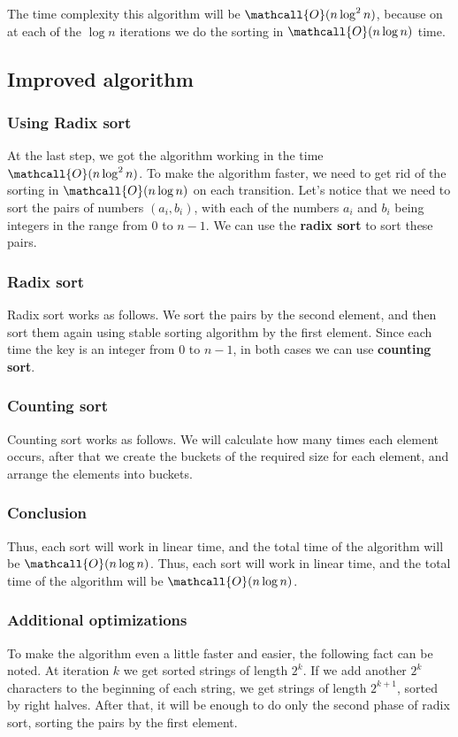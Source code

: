 \documentclass[11pt]{article}
\begin{document}
The time complexity this algorithm will be \(\mathcall{O}(n \log^2 n)\), because on at each of the
\(\log n\) iterations we do the sorting in \(\mathcall{O}(n \log n)\) time.

\subsection{Improved algorithm}
\label{sec:org8bbc231}
\subsubsection{Using Radix sort}
\label{sec:org12992ee}
At the last step, we got the algorithm working in the time \(\mathcall{O}(n \log^2 n)\). To make
the algorithm faster, we need to get rid of the sorting in \(\mathcall{O}(n \log n)\) on each
transition. Let's notice that we need to sort the pairs of numbers \((a_i, b_i)\), with each of
the numbers \(a_i\) and \(b_i\) being integers in the range from \(0\) to \(n - 1\). We can use the
\textbf{radix sort} to sort these pairs.

\subsubsection{Radix sort}
\label{sec:orgb717c36}
Radix sort works as follows. We sort the pairs by the second element, and then sort them again
using stable sorting algorithm by the first element. Since each time the key is an integer from
\(0\) to \(n - 1\), in both cases we can use \textbf{counting sort}.

\subsubsection{Counting sort}
\label{sec:org9faf43d}
Counting sort works as follows. We will calculate how many times each element occurs, after that
we create the buckets of the required size for each element, and arrange the elements into buckets.

\subsubsection{Conclusion}
\label{sec:org0016db4}
Thus, each sort will work in linear time, and the total time of the algorithm will be
\(\mathcall{O}(n \log n)\). Thus, each sort will work in linear time, and the total time of the
algorithm will be \(\mathcall{O}(n \log n)\).    

\subsubsection{Additional optimizations}
\label{sec:org3f9b786}
To make the algorithm even a little faster and easier, the following fact can be noted. At
iteration \(k\) we get sorted strings of length \(2^k\). If we add another \(2^k\) characters to the
beginning of each string, we get strings of length \(2^{k + 1}\), sorted by right halves. After
that, it will be enough to do only the second phase of radix sort, sorting the pairs by the
first element.
\end{document}
